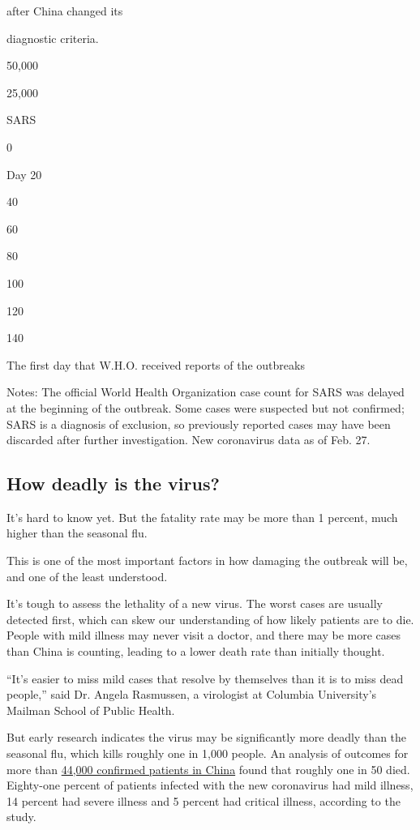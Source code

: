 after China changed its

diagnostic criteria.

50,000

25,000

SARS

0

Day 20

40

60

80

100

120

140

The first day that W.H.O. received reports of the outbreaks

Notes: The official World Health Organization case count for SARS was
delayed at the beginning of the outbreak. Some cases were suspected but
not confirmed; SARS is a diagnosis of exclusion, so previously reported
cases may have been discarded after further investigation. New
coronavirus data as of Feb. 27.

\hypertarget{how-deadly-is-the-virus}{%
\subsection{How deadly is the virus?}\label{how-deadly-is-the-virus}}

It's hard to know yet. But the fatality rate may be more than 1 percent,
much higher than the seasonal flu.

This is one of the most important factors in how damaging the outbreak
will be, and one of the least understood.

It's tough to assess the lethality of a new virus. The worst cases are
usually detected first, which can skew our understanding of how likely
patients are to die. People with mild illness may never visit a doctor,
and there may be more cases than China is counting, leading to a lower
death rate than initially thought.

``It's easier to miss mild cases that resolve by themselves than it is
to miss dead people,'' said Dr. Angela Rasmussen, a virologist at
Columbia University's Mailman School of Public Health.

But early research indicates the virus may be significantly more deadly
than the seasonal flu, which kills roughly one in 1,000 people. An
analysis of outcomes for more than
\href{https://jamanetwork.com/journals/jama/fullarticle/2762130}{44,000
confirmed patients in China} found that roughly one in 50 died.
Eighty-one percent of patients infected with the new coronavirus had
mild illness, 14 percent had severe illness and 5 percent had critical
illness, according to the study.


